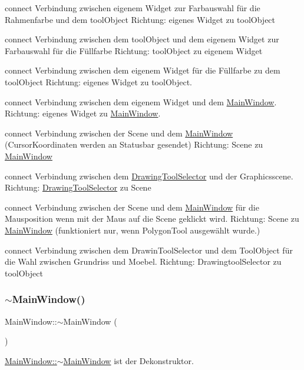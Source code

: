connect Verbindung zwischen eigenem Widget zur Farbauswahl für die Rahmenfarbe und dem tool\+Object Richtung\+: eigenes Widget zu tool\+Object

connect Verbindung zwischen dem tool\+Object und dem eigenem Widget zur Farbauswahl für die Füllfarbe Richtung\+: tool\+Object zu eigenem Widget

connect Verbindung zwischen dem eigenem Widget für die Füllfarbe zu dem tool\+Object Richtung\+: eigenes Widget zu tool\+Object.

connect Verbindung zwischen dem eigenem Widget und dem \hyperlink{class_main_window}{Main\+Window}. Richtung\+: eigenes Widget zu \hyperlink{class_main_window}{Main\+Window}.

connect Verbindung zwischen der Scene und dem \hyperlink{class_main_window}{Main\+Window} (Cursor\+Koordinaten werden an Statusbar gesendet) Richtung\+: Scene zu \hyperlink{class_main_window}{Main\+Window}

connect Verbindung zwischen dem \hyperlink{class_drawing_tool_selector}{Drawing\+Tool\+Selector} und der Graphicsscene. Richtung\+: \hyperlink{class_drawing_tool_selector}{Drawing\+Tool\+Selector} zu Scene

connect Verbindung zwischen der Scene und dem \hyperlink{class_main_window}{Main\+Window} für die Mausposition wenn mit der Maus auf die Scene geklickt wird. Richtung\+: Scene zu \hyperlink{class_main_window}{Main\+Window} (funktioniert nur, wenn Polygon\+Tool ausgewählt wurde.)

connect Verbindung zwischen dem Drawin\+Tool\+Selector und dem Tool\+Object für die Wahl zwischen Grundriss und Moebel. Richtung\+: Drawingtool\+Selector zu tool\+Object\mbox{\label{class_main_window_ae98d00a93bc118200eeef9f9bba1dba7}} 
\subsubsection{\texorpdfstring{$\sim$\+Main\+Window()}{~MainWindow()}}
{\footnotesize\ttfamily Main\+Window\+::$\sim$\+Main\+Window (\begin{DoxyParamCaption}{ }\end{DoxyParamCaption})}



\hyperlink{class_main_window_ae98d00a93bc118200eeef9f9bba1dba7}{Main\+Window\+::$\sim$\+Main\+Window} ist der Dekonstruktor. 



